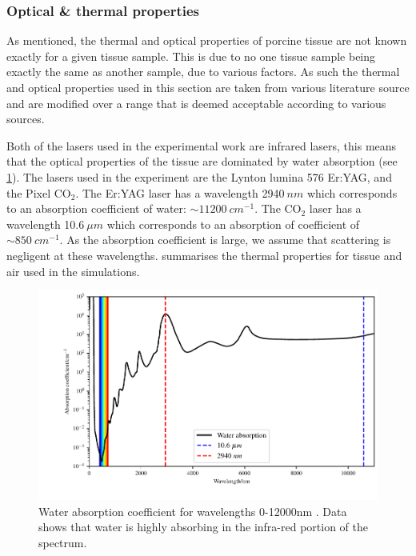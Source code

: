 \subsubsection{Optical \& thermal properties}

As mentioned, the thermal and optical properties of porcine tissue are not known exactly for a given tissue sample. This is due to no one tissue sample being exactly the same as another sample, due to various factors. As such the thermal and optical properties used in this section are taken from various literature source and are modified over a range that is deemed acceptable according to various sources.

Both of the lasers used in the experimental work are infrared lasers, this means that the optical properties of the tissue are dominated by water absorption (see \cref{fig:waterabsor}). The lasers used in the experiment are the Lynton lumina 576 Er:YAG, and the Pixel CO$_2$. The Er:YAG laser has a wavelength 2940$~nm$ which corresponds to an absorption coefficient of water: $\sim 11200~cm^{-1}$. The CO$_2$ laser has a wavelength 10.6$~\mu m$ which corresponds to an absorption of coefficient of $\sim 850~cm^{-1}$. As the absorption coefficient is large, we assume that scattering is negligent at these wavelengths.
 summarises the thermal properties for tissue and air used in the simulations.  

\begin{figure}	
\vspace{-10pt}
	\centering
	\includegraphics[width=\columnwidth]{./ablation/images/water.pdf}
	\caption{Water absorption coefficient for wavelengths 0-12000nm \cite{segelstein1981complex}. Data shows that water is highly absorbing in the infra-red portion of the spectrum.}
	\label{fig:waterabsor}
	\vspace{-10pt}
\end{figure}

